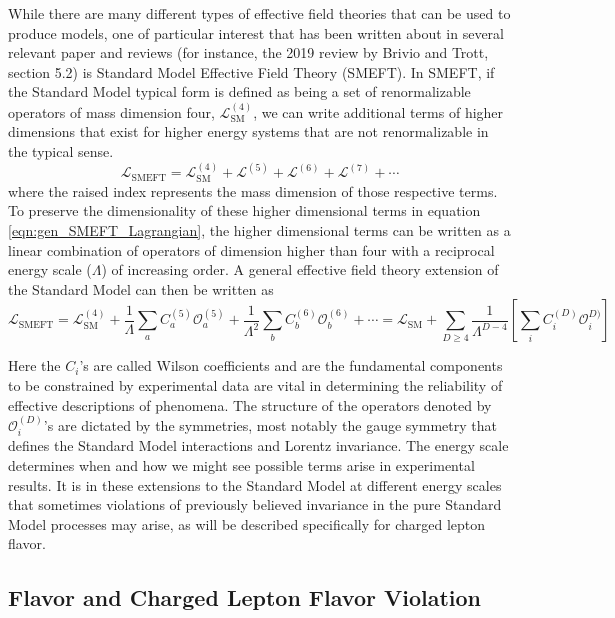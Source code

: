 \documentclass[12pt]{article}
\begin{document}
While there are many different types of effective field theories that can be used to produce models, one of particular interest that has been written about in several relevant paper and reviews (for instance, \cite{Brivio_2019} the 2019  review by Brivio and Trott, section 5.2) is Standard Model Effective Field Theory (SMEFT). In SMEFT, if the Standard Model typical form is defined as being a set of renormalizable operators of mass dimension four, $\mathcal{L}_\text{SM}^{(4)}$, we can write additional terms of higher dimensions that exist for higher energy systems that are not renormalizable in the typical sense. 
\begin{equation}\label{eqn:gen_SMEFT_Lagrangian}
\mathcal{L}_\text{SMEFT}=\mathcal{L}_{\text{SM}}^{(4)}+\mathcal{L}^{(5)}+\mathcal{L}^{(6)}+\mathcal{L}^{(7)}+\cdots
\end{equation}
where the raised index represents the mass dimension of those respective terms. To preserve the dimensionality of these higher dimensional terms in equation \ref{eqn:gen_SMEFT_Lagrangian}, the higher dimensional terms can be written as a linear combination of operators of dimension higher than four with a reciprocal energy scale ($\Lambda$) of increasing order. A general effective field theory extension of the Standard Model can then be written as
\begin{equation}\label{eqn:SMEFT_Lagrangian_expanded}
\mathcal{L}_{\text{SMEFT}} = \mathcal{L}^{(4)}_\text{SM}+\frac{1}{\Lambda}\sum_a C_a^{(5)}\mathcal{O}^{(5)}_a + \frac{1}{\Lambda^2}\sum_b C^{(6)}_b\mathcal{O}^{(6)}_b +\cdots= \mathcal{L}_{\text{SM}}+\sum_{D\geq 4}\frac{1}{\Lambda^{D-4}}\left[\sum_i C^{(D)}_i\mathcal{O}^{D)}_i\right]
\end{equation}

Here the $C_i$'s are called Wilson coefficients and are the fundamental components to be constrained by experimental data are vital in determining the reliability of effective descriptions of phenomena. The structure of the operators denoted by $\mathcal{O}^{(D)}_i$'s are dictated by the symmetries, most notably the gauge symmetry that defines the Standard Model interactions and Lorentz invariance. The energy scale determines when and how we might see possible terms arise in experimental results. It is in these extensions to the Standard Model at different energy scales that sometimes violations of previously believed invariance in the pure Standard Model processes may arise, as will be described specifically for charged lepton flavor.

\subsection{Flavor and Charged Lepton Flavor Violation}\label{subsec:FlavorCLFV}
\end{document}
